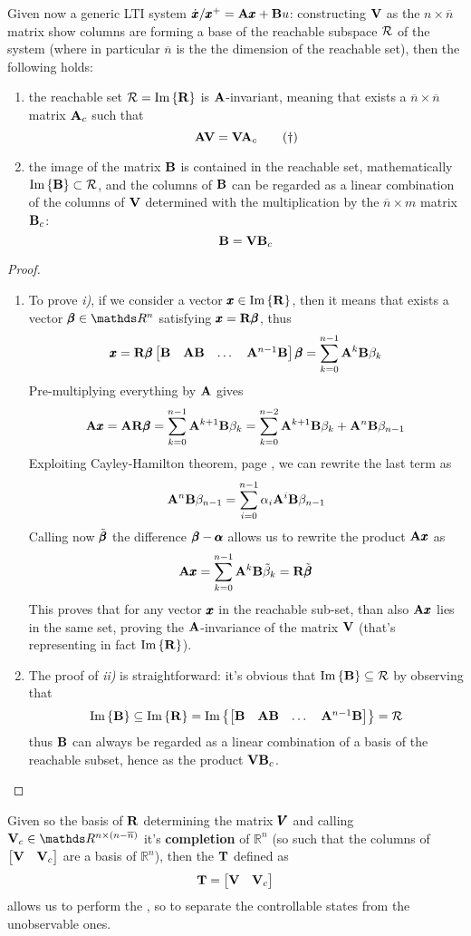 	Given now a generic LTI system $\dot{\pmb{x}} /\pmb{x}^+ = \mathbf{A}\pmb{x} + \mathbf{B} u$: constructing $\mathbf{V}$ as the $n\times \overline n$ matrix show columns are forming a base of the reachable subspace $\mathcal R$ of the system (where in particular $\overline n$ is the the dimension of the reachable set), then the following holds:
	\begin{enumerate} [\itshape i)]
		\item the reachable set $\mathcal R = \textrm{Im}\left\{\mathbf{R}\right\}$ is $\mathbf{A}$-invariant, meaning that exists a $\overline n\times \overline n$ matrix $\mathbf{A}_c$ such that
		\[ \mathbf{A} \mathbf{V} = \mathbf{V} \mathbf{A}_c \tag{$\dagger$} \]
		\item the image of the matrix $\mathbf{B}$ is contained in the reachable set, mathematically $\textrm{Im}\left\{\mathbf{B}\right\} \subset \mathcal R$, and the columns of $\mathbf{B}$ can be regarded as a linear combination of the columns of $\mathbf{V}$ determined with the multiplication by the $\overline n \times m$ matrix $\mathbf{B}_c$:
		\[ \mathbf{B}= \mathbf{V} \mathbf{B}_c \]
	\end{enumerate}
	\begin{proof}
	\begin{enumerate}[\itshape a)]
		\item To prove \textit{i)}, if we consider a vector $\pmb{x} \in \textrm{Im}\left\{\mathbf{R}\right\}$, then it means that exists a vector $\vet \beta\in\mathds R^n$ satisfying $\pmb{x} = \mathbf{R} \pmb{\beta}$, thus
		\[ \pmb{x} = \mathbf{R} \pmb{\beta} \begin{bmatrix} \mathbf{B}&\mathbf{A}\mathbf{B} &\dots & \mathbf{A}^{n-1}\mathbf{B} \end{bmatrix} \pmb{\beta} = \sum_{k=0}^{n-1}\mathbf{A}^k\mathbf{B} \beta_k \]
		Pre-multiplying everything by $\mathbf{A}$ gives
		\[ \mathbf{A}\pmb{x} = \mathbf{A}\mathbf{R}\pmb{\beta} = \sum_{k=0}^{n-1} \mathbf{A}^{k+1} \mathbf{B} \beta_k = \sum_{k=0}^{n-2} \mathbf{A}^{k+1} \mathbf{B} \beta_k + \mathbf{A}^n \mathbf{B} \beta_{n-1} \]
		Exploiting Cayley-Hamilton theorem, page \pageref{th:cayley}, we can rewrite the last term as
		\[ \mathbf{A}^n \mathbf{B} \beta_{n-1} = \sum_{i=0}^{n-1} \alpha_i \mathbf{A}^i \mathbf{B} \beta_{n-1} \]
		Calling now $\tilde{\pmb{\beta}}$ the difference $\pmb{\beta}-\pmb{\alpha}$ allows us to rewrite the product $\mathbf{A}\pmb{x}$ as
		\[ \mathbf{A}\pmb{x} = \sum_{k=0}^{n-1}\mathbf{A}^k \mathbf{B} \tilde\beta_k = \mathbf{R} \tilde{\pmb{\beta}} \]
		This proves that for any vector $\pmb{x}$ in the reachable sub-set, than also $\mathbf{A}\pmb{x}$ lies in the same set, proving the $\mathbf{A}$-invariance of the matrix $\mathbf{V}$ (that's representing in fact $\textrm{Im}\left\{\mathbf{R}\right\}$).
		
		\item The proof of \textit{ii)} is straightforward: it's obvious that $\textrm{Im}\left\{\mathbf{B}\right\} \subseteq \mathcal R$ by observing that
		\[ \textrm{Im}\left\{\mathbf{B}\right\} \subseteq \textrm{Im}\left\{\mathbf{R}\right\} = \textrm{Im}\left\{\begin{bmatrix} \mathbf{B} & \mathbf{A}\mathbf{B} & \dots & \mathbf{A}^{n-1}\mathbf{B} \end{bmatrix}\right\} = \mathcal R \]
		thus $\mathbf{B}$ can always be regarded as a linear combination of a basis of the reachable subset, hence as the product $\mathbf{V} \mathbf{B}_c$.
	\end{enumerate}
	\end{proof}
	Given so the basis of $\mathbf{R}$ determining the matrix $\pmb{V}$ and calling $\V_c\in \mathds R^{n\times(n-\overline n)}$ it's \textbf{completion} of $\mathds R^n$ (so such that the columns of $\begin{bmatrix} \mathbf{V} & \mathbf{V}_c \end{bmatrix}$ are a basis of $\mathds R^n$), then the  $\mathbf{T}$ defined as
	\begin{equation}
		\mathbf{T} = \begin{bmatrix} \mathbf{V} & \mathbf{V}_c \end{bmatrix}
	\end{equation}
	allows us to perform the , so to separate the controllable states from the unobservable ones.
	
